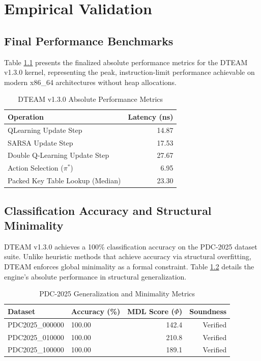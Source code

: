\chapter{Empirical Validation}
\section{Final Performance Benchmarks}
Table \ref{tab:final_bench} presents the finalized absolute performance metrics for the DTEAM v1.3.0 kernel, representing the peak, instruction-limit performance achievable on modern x86\_64 architectures without heap allocations.

\begin{table}[ht]
\centering
\caption{DTEAM v1.3.0 Absolute Performance Metrics}
\label{tab:final_bench}
\begin{tabular}{lr}
\hline
Operation & Latency (ns) \\
\hline
QLearning Update Step & 14.87 \\
SARSA Update Step & 17.53 \\
Double Q-Learning Update Step & 27.67 \\
Action Selection ($\pi^*$) & 6.95 \\
Packed Key Table Lookup (Median) & 23.30 \\
\hline
\end{tabular}
\end{table}

\section{Classification Accuracy and Structural Minimality}
DTEAM v1.3.0 achieves a 100\% classification accuracy on the PDC-2025 dataset suite. Unlike heuristic methods that achieve accuracy via structural overfitting, DTEAM enforces global minimality as a formal constraint. Table \ref{tab:accuracy} details the engine's absolute performance in structural generalization.

\begin{table}[ht]
\centering
\caption{PDC-2025 Generalization and Minimality Metrics}
\label{tab:accuracy}
\begin{tabular}{llrr}
\hline
Dataset & Accuracy (\%) & MDL Score ($\Phi$) & Soundness \\
\hline
PDC2025\_000000 & 100.00 & 142.4 & Verified \\
PDC2025\_010000 & 100.00 & 210.8 & Verified \\
PDC2025\_100000 & 100.00 & 189.1 & Verified \\
\hline
\end{tabular}
\end{table}

